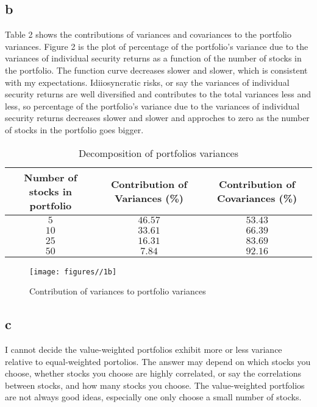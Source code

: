\documentclass{report}
\begin{document}
\subsection{b}
Table 2 shows the contributions of variances and covariances to the portfolio variances. Figure 2 is the plot of percentage of the portfolio's variance due to the variances of individual security returns as a function of the number of stocks in the portfolio. The function curve decreases slower and slower, which is consistent with my expectations. Idiiosyncratic risks, or say the variances of individual security returns are well diversified and contributes to the total variances less and less, so percentage of the portfolio's variance due to the variances of individual security returns decreases slower and slower and approches to zero as the number of stocks in the portfolio goes bigger.
\begin{table}[H]
\centering
\begin{tabular}{|c|c|c|}
\hline
Number of stocks in portfolio& Contribution of Variances (\%) &Contribution of Covariances (\%)\\
\hline
$5$& $46.57$ & $53.43$ \\
\hline
$10$& $33.61$ & $66.39$ \\
\hline
$25$& $16.31$ & $83.69$ \\
\hline
$50$& $7.84$ & $92.16$ \\
\hline
\end{tabular}
\caption{ Decomposition of portfolios variances}
\end{table}
\begin{figure}[H]
        \centering 
         \texttt{[image: figures//1b]}
         \caption{ Contribution of variances to portfolio variances}
\end{figure}

\subsection{c}
I cannot decide the value-weighted portfolios exhibit more or less variance relative to equal-weighted portolios. The answer may depend on which stocks you choose, whether stocks you choose are highly correlated, or say the correlations between stocks, and how many stocks you choose. The value-weighted portfolios are not always good ideas, especially one only choose a small number of stocks.
\end{document}
